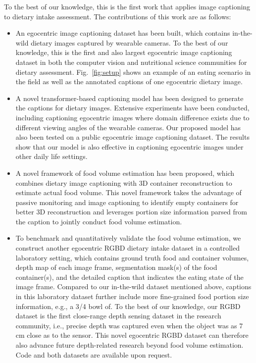 \documentclass[journal]{IEEEtran}
\begin{document}
To the best of our knowledge, this is the first work that applies image captioning to dietary intake assessment. The contributions of this work are as follows:
\begin{itemize}
    \item An egocentric image captioning dataset has been built, which contains in-the-wild dietary images captured by wearable cameras. To the best of our knowledge, this is the first and also largest egocentric image captioning dataset in both the computer vision and nutritional science communities for dietary assessment. Fig.~\ref{fig:setup} shows an example of an eating scenario in the field as well as the annotated captions of one egocentric dietary image.
    \item A novel transformer-based captioning model has been designed to generate the captions for dietary images. Extensive experiments have been conducted, including captioning egocentric images where domain difference exists due to different viewing angles of the wearable cameras. Our proposed model has also been tested on a public egocentric image captioning dataset. The results show that our model is also effective in captioning egocentric images under other daily life settings.
    \item A novel framework of food volume estimation has been proposed, which combines dietary image captioning with 3D container reconstruction to estimate actual food volume. This novel framework takes the advantage of passive monitoring and image captioning to identify empty containers for better 3D reconstruction and leverages portion size information parsed from the caption to jointly conduct food volume estimation. 
    \item To benchmark and quantitatively validate the food volume estimation, we construct another egocentric RGBD dietary intake dataset in a controlled laboratory setting, which contains ground truth food and container volumes, depth map of each image frame, segmentation mask(s) of the food container(s), and the detailed caption that indicates the eating state of the image frame. Compared to our in-the-wild dataset mentioned above, captions in this laboratory dataset further include more fine-grained food portion size information, e.g., a 3/4 bowl of. To the best of our knowledge, our RGBD dataset is the first close-range depth sensing dataset in the research community, i.e., precise depth was captured even when the object was as 7 cm close as to the sensor. This novel egocentric RGBD dataset can therefore also advance future depth-related research beyond food volume estimation. Code and both datasets are available upon request.
\end{itemize}
\end{document}
